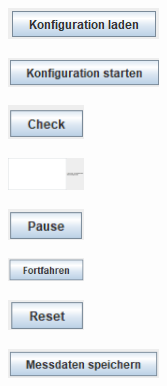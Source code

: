 \documentclass[parskip=full]{scrartcl}
\begin{document}
\begin{flushleft}
    \includegraphics[width = 4cm]{Grafiken/5-Konfiguration_laden.png}
\end{flushleft}

\begin{flushleft}
    \includegraphics[width = 4cm]{Grafiken/6-Konfiguration_starten.png}
\end{flushleft}

\begin{flushleft}
    \includegraphics[width = 2cm]{Grafiken/7-Check.png}
\end{flushleft}

\begin{flushleft}
    \includegraphics[width = 2cm]{Grafiken/8-Editor.png}
\end{flushleft}

\begin{flushleft}
    \includegraphics[width = 2cm]{Grafiken/9-Pause.png}
\end{flushleft}

\begin{flushleft}
    \includegraphics[width = 2cm]{Grafiken/10-Fortfahren.png}
\end{flushleft}

\begin{flushleft}
    \includegraphics[width = 2cm]{Grafiken/11-Reset.png}
\end{flushleft}

\begin{flushleft}
    \includegraphics[width = 4cm]{Grafiken/12-Messdaten_speichern.png}
\end{flushleft}
\end{document}
